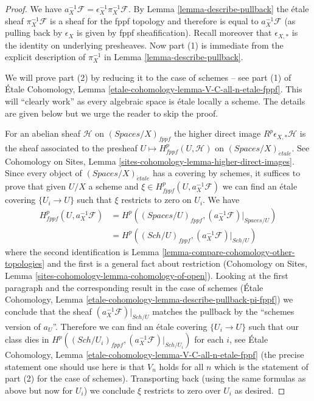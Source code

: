 \documentclass{stacks-project}
\theoremstyle{plain}
\theoremstyle{definition}
\theoremstyle{remark}
\numberwithin{equation}{subsection}
\def\Sch{\mathit{Sch}}
\def\etale{{\acute{e}tale}}
\begin{document}
\begin{proof}
We have $a_X^{-1}\mathcal{F} = \epsilon_X^{-1} \pi_X^{-1}\mathcal{F}$.
By Lemma \ref{lemma-describe-pullback} the \'etale sheaf
$\pi_X^{-1}\mathcal{F}$ is a sheaf for the fppf topology
and therefore is equal to $a_X^{-1}\mathcal{F}$ (as pulling
back by $\epsilon_X$ is given by fppf sheafification).
Recall moreover that $\epsilon_{X, *}$ is the identity
on underlying presheaves.
Now part (1) is immediate from the explicit description of $\pi_X^{-1}$
in Lemma \ref{lemma-describe-pullback}.

\medskip\noindent
We will prove part (2) by reducing it to the case of schemes --
see part (1) of
\'Etale Cohomology, Lemma \ref{etale-cohomology-lemma-V-C-all-n-etale-fppf}.
This will ``clearly work'' as every algebraic space is
\'etale locally a scheme. The details are given below but we urge
the reader to skip the proof.

\medskip\noindent
For an abelian sheaf $\mathcal{H}$ on $(\textit{Spaces}/X)_{fppf}$ the
higher direct image $R^p\epsilon_{X, *}\mathcal{H}$ is the sheaf
associated to the presheaf $U \mapsto H^p_{fppf}(U, \mathcal{H})$
on $(\textit{Spaces}/X)_\etale$. See
Cohomology on Sites, Lemma \ref{sites-cohomology-lemma-higher-direct-images}.
Since every object of $(\textit{Spaces}/X)_\etale$ has a covering
by schemes, it suffices to prove that given $U/X$ a scheme and
$\xi \in H^p_{fppf}(U, a_X^{-1}\mathcal{F})$ we can find
an \'etale covering $\{U_i \to U\}$ such that $\xi$
restricts to zero on $U_i$. We have
\begin{align*}
H^p_{fppf}(U, a_X^{-1}\mathcal{F})
& =
H^p((\textit{Spaces}/U)_{fppf}, (a_X^{-1}\mathcal{F})|_{\textit{Spaces}/U}) \\
& =
H^p((\Sch/U)_{fppf}, (a_X^{-1}\mathcal{F})|_{\Sch/U})
\end{align*}
where the second identification is
Lemma \ref{lemma-compare-cohomology-other-topologies}
and the first is a general fact about restriction
(Cohomology on Sites, Lemma \ref{sites-cohomology-lemma-cohomology-of-open}).
Looking at the first paragraph and the corresponding result in the
case of schemes (\'Etale Cohomology, Lemma
\ref{etale-cohomology-lemma-describe-pullback-pi-fppf})
we conclude that the sheaf $(a_X^{-1}\mathcal{F})|_{\Sch/U}$
matches the pullback by the ``schemes version of $a_U$''.
Therefore we can find an \'etale covering
$\{U_i \to U\}$ such that our class dies in
$H^p((\Sch/U_i)_{fppf}, (a_X^{-1}\mathcal{F})|_{\Sch/U_i})$
for each $i$, see
\'Etale Cohomology, Lemma \ref{etale-cohomology-lemma-V-C-all-n-etale-fppf}
(the precise statement one should use here is that $V_n$ holds for all $n$
which is the statement of part (2) for the case of schemes).
Transporting back (using the same formulas as above but now for
$U_i$) we conclude $\xi$ restricts to zero over $U_i$ as desired.
\end{proof}
\end{document}

